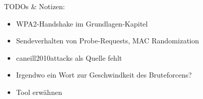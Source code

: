 TODOs \& Notizen:
\begin{itemize}
	\item WPA2-Handshake im Grundlagen-Kapitel
	\item Sendeverhalten von Probe-Requests, MAC Randomization
	\item caneill2010attacks als Quelle fehlt
	\item Irgendwo ein Wort zur Geschwindkeit des Bruteforcens?
	\item Tool erwähnen
\end{itemize}